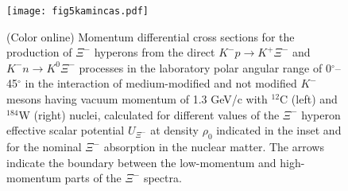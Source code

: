 \documentclass[12pt]{article}
\begin{document}
\begin{figure}[!h]
\begin{center}
\texttt{[image: fig5kamincas.pdf]}
\vspace*{-2mm} \caption{(Color online) Momentum differential cross sections for the production of $\Xi^-$
hyperons from the direct ${K^-}p \to {K^+}{\Xi^-}$ and ${K^-}n \to {K^0}{\Xi^-}$
processes in the laboratory polar angular range of
0$^{\circ}$--45$^{\circ}$ in the interaction of medium-modified and not modified
$K^-$ mesons having vacuum momentum of 1.3 GeV/c with $^{12}$C
(left) and $^{184}$W (right) nuclei, calculated for different values of the $\Xi^-$ hyperon effective
scalar potential $U_{\Xi^-}$ at density $\rho_0$ indicated in the inset and
for the nominal $\Xi^-$ absorption in the nuclear matter.
The arrows indicate the boundary between the low-momentum and high-momentum parts of the $\Xi^-$ spectra.}
\label{void}
\end{center}
\end{figure}
\end{document}
